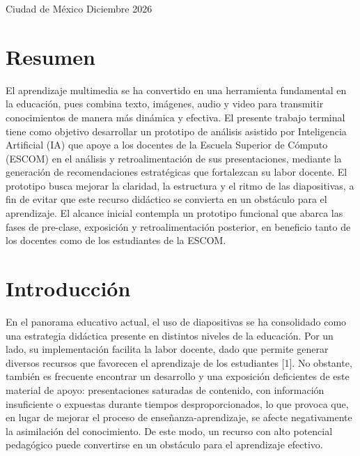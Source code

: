 \documentclass[11pt]{article}
\begin{document}
\begin{titlepage}
    \vfill

    \begin{center}
        {\large Ciudad de México \quad\textbullet\quad Diciembre 2026}
    \end{center}
\end{titlepage}

\tableofcontents
\newpage
\listoffigures
\newpage
\listoftables
\newpage


\section*{Resumen}

El aprendizaje multimedia se ha convertido en una herramienta fundamental en la educación, pues combina texto, imágenes, audio y video para transmitir conocimientos de manera más dinámica y efectiva. El presente trabajo terminal tiene como objetivo desarrollar un prototipo de análisis asistido por Inteligencia Artificial (IA) que apoye a los docentes de la Escuela Superior de Cómputo (ESCOM) en el análisis y retroalimentación de sus presentaciones, mediante la generación de recomendaciones estratégicas que fortalezcan su labor docente. El prototipo busca mejorar la claridad, la estructura y el ritmo de las diapositivas, a fin de evitar que este recurso didáctico se convierta en un obstáculo para el aprendizaje. El alcance inicial contempla un prototipo funcional que abarca las fases de pre-clase, exposición y retroalimentación posterior, en beneficio tanto de los docentes como de los estudiantes de la ESCOM.

\section*{Introducción}
En el panorama educativo actual, el uso de diapositivas se ha consolidado como una estrategia didáctica presente en distintos niveles de la educación. Por un lado, su implementación facilita la labor docente, dado que permite generar diversos recursos que favorecen el aprendizaje de los estudiantes [1]. No obstante, también es frecuente encontrar un desarrollo y una exposición deficientes de este material de apoyo: presentaciones saturadas de contenido, con información insuficiente o expuestas durante tiempos desproporcionados, lo que provoca que, en lugar de mejorar el proceso de enseñanza-aprendizaje, se afecte negativamente la asimilación del conocimiento. De este modo, un recurso con alto potencial pedagógico puede convertirse en un obstáculo para el aprendizaje efectivo.
\end{document}
